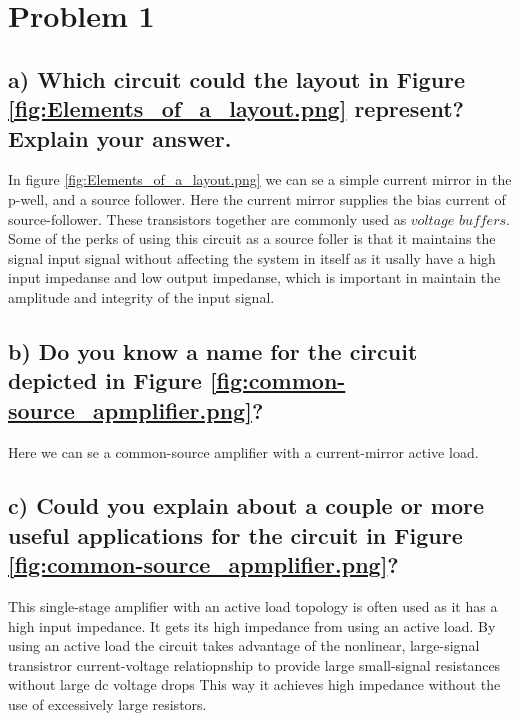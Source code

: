 \section{Problem 1}

\subsection*{a) Which circuit could the layout in Figure \ref{fig:Elements_of_a_layout.png} represent? Explain your answer.}

In figure \ref{fig:Elements_of_a_layout.png} we can se a simple current mirror in the p-well, and a source follower. Here the current mirror supplies the bias current of source-follower. These transistors together are commonly used as $\textit{voltage buffers}$. Some of the perks of using this circuit as a source foller is that it maintains the signal input signal without affecting the system in itself as it usally have a high input impedanse and low output impedanse, which is important in maintain the amplitude and integrity of the input signal.


\subsection*{b) Do you know a name for the circuit depicted in Figure \ref{fig:common-source_apmplifier.png}?}
Here we can se a common-source amplifier with a current-mirror active load. 

\subsection*{c) Could you explain about a couple or more useful applications for the circuit in
Figure \ref{fig:common-source_apmplifier.png}?}

This single-stage amplifier with an active load topology is often used as it has a high input impedance. It gets its high impedance from using an active load. By using an active load the circuit takes advantage of the nonlinear, large-signal transistror current-voltage relatiopnship to provide large small-signal resistances without large dc voltage drops This way it achieves high impedance without the use of excessively large resistors.

